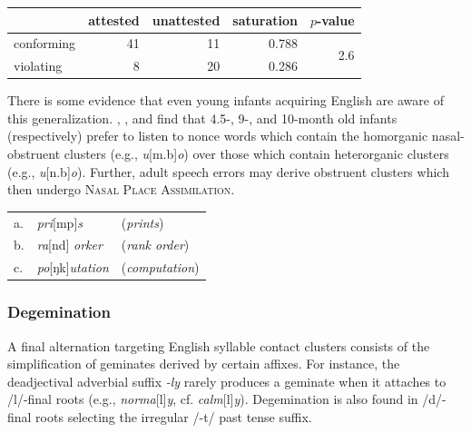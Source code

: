 \begin{example}
\begin{tabular}{l r r r r}
\toprule
           & attested & unattested & saturation & $p$-value                   \\
\midrule
conforming & 41       & 11         & 0.788      & \multirow{2}{*}{2.6\e{-05}} \\
violating  & 8        & 20         & 0.286                                    \\
\bottomrule
\end{tabular}
\end{example}

There is some evidence that even young infants acquiring English are aware of this generalization. \citet{Davidson2004}, \citet{Mattys1999}, and \citet{Jusczyk2002} find that 4.5-, 9-, and 10-month old infants (respectively) prefer to listen to nonce words which contain the homorganic nasal-obstruent clusters (e.g., \emph{u}[m.b]\emph{o}) over those which contain heterorganic clusters (e.g., \emph{u}[n.b]\emph{o}). Further, adult speech errors may derive obstruent clusters which then undergo \textsc{Nasal Place Assimilation}.

\begin{example}
\begin{tabular}{l l l}
a. & \emph{pri}[mp]\emph{s}      & (\emph{prints})      \\
b. & \emph{ra}[nd] \emph{orker}  & (\emph{rank order})  \\
c. & \emph{po}[ŋk]\emph{utation} & (\emph{computation}) \\
\end{tabular} 
\end{example}

\subsubsection{Degemination}

A final alternation targeting English syllable contact clusters consists of the simplification of geminates derived by certain affixes. For instance, the deadjectival adverbial suffix \emph{-ly} rarely produces a geminate when it attaches to /l/-final roots (e.g., \emph{norma}[l]\emph{y}, cf. \emph{calm}[l]\emph{y}). Degemination is also found in /d/-final roots selecting the irregular /-t/ past tense suffix.

